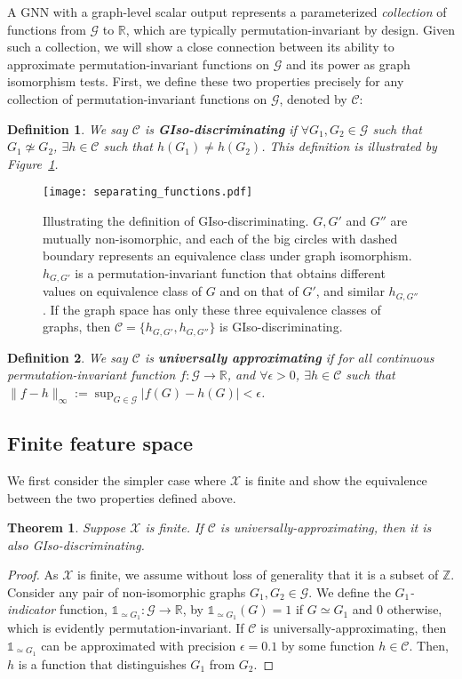 \documentclass{article}
\newtheorem{theorem}{Theorem}
\newtheorem{definition}{Definition}
\def\Gfun{\mathcal{G}}
\begin{document}
A GNN with a graph-level scalar output represents a parameterized \emph{collection} of functions from $\Gfun$ to $\mathbb{R}$, which are typically permutation-invariant by design.
Given such a collection, we will show a close connection between its ability to approximate 
 permutation-invariant functions on $\Gfun$ and its power as graph isomorphism tests.  
First, we define these two properties precisely for any collection of permutation-invariant functions on $\Gfun$, denoted by $\mathcal{C}$:
\begin{definition}
\label{pd}
We say $\mathcal C$ is \textbf{GIso-discriminating} if $\forall G_1, G_2 \in \Gfun$ such that $G_1 \not\simeq G_2$,  $\exists h \in \mathcal{C}$ such that $h(G_1) \neq h(G_2)$. This definition is illustrated by Figure~\ref{fig:giso}. 
\end{definition}
\begin{figure}
\label{fig:giso}
    \centering
    \texttt{[image: separating\_functions.pdf]}
\caption{Illustrating the definition of GIso-discriminating. $G, G'$ and $G''$ are mutually non-isomorphic, and each of the big circles with dashed boundary represents an equivalence class under graph isomorphism. $h_{G, G'}$ is a permutation-invariant function that obtains different values on equivalence class of $G$ and on that of $G'$, and similar $h_{G, G''}$. If the graph space has only these three equivalence classes of graphs, then $\mathcal{C} = \{h_{G, G'}, h_{G, G''} \}$ is GIso-discriminating.}
\end{figure}
\begin{definition}
\label{def:ua}
We say $\mathcal C$ is \textbf{universally approximating} if for all continuous permutation-invariant function $f: \Gfun \to \mathbb{R}$, and $\forall \epsilon > 0$, $\exists h \in \mathcal{C}$ such that $\| f - h \|_{\infty} := \sup_{G \in \Gfun} |f(G) - h(G)| < \epsilon$.
\end{definition}

\subsection{Finite feature space}
We first consider the simpler case where $\mathcal{X}$ is finite and show the equivalence between the two properties defined above.
\begin{theorem}
\label{UA2PD}
Suppose $\mathcal{X}$ is finite. If $\mathcal{C}$ is universally-approximating, then it is also GIso-discriminating.
\end{theorem}
\begin{proof}
As $\mathcal{X}$ is finite, we assume without loss of generality that it is a subset of $\mathbb{Z}$. Consider any pair of non-isomorphic graphs $G_1, G_2 \in \Gfun$. We define the \emph{$G_1$-indicator} function, $\mathds{1}_{\simeq G_1}: \Gfun \to \mathbb R$, by $\mathds{1}_{\simeq G_1}(G)=1$ if  $G \simeq G_1$ and 0 otherwise, which is evidently permutation-invariant. If $\mathcal{C}$ is universally-approximating, then $\mathds{1}_{\simeq G_1}$ can be approximated with precision $\epsilon = 0.1$ by some function $h \in \mathcal{C}$. Then, $h$ is a function that distinguishes $G_1$ from $G_2$.
\end{proof}
\end{document}

